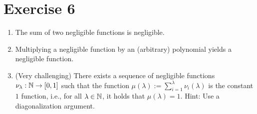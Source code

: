 \documentclass{article}      	%
\begin{document}
\section*{Exercise 6}

\begin{enumerate}[label = (\alph*)] %
    \item The sum of two negligible functions is negligible.
    \item Multiplying a negligible function by an (arbitrary) polynomial yields a negligible function.
    \item (Very challenging) There exists a sequence of negligible functions 
    $\nu_\lambda: \mathbb{N} \rightarrow[0,1]$ 
    such that the function
    $\mu(\lambda) := \sum_{i = 1}^\lambda \nu_i(\lambda)$
    is the constant $1$ function, i.e., for all $\lambda \in \mathbb{N}$, it holds that $\mu(\lambda) = 1$. Hint: Use a diagonalization argument.
\end{enumerate}
\end{document}
